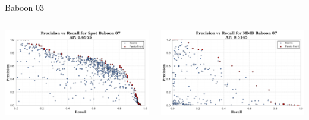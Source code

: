 \begin{frame}{Baboon 03}
    \begin{columns}
        \begin{column}{0.5\textwidth}
            \centering
            \includegraphics[width=\textwidth,keepaspectratio]{images/bom/precision_recall_Spot_Baboon_07.png}
        \end{column}
        \begin{column}{0.5\textwidth}
            \centering
            \includegraphics[width=\textwidth,keepaspectratio]{images/bom/precision_recall_MMB_Baboon_07.png}
        \end{column}
    \end{columns}
\end{frame}
